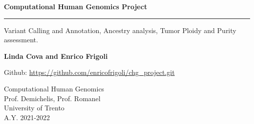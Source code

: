 \begin{titlepage}
    \begin{center}
        \vspace*{1cm}
        
        \Huge
        \textbf{Computational Human Genomics Project}

        \vspace{0.3cm}

        \rule{\textwidth}{.4pt}

        \vspace{0.5cm}
        
        \LARGE
        Variant Calling and Annotation, Ancestry analysis, Tumor Ploidy and Purity assessment.
        
        
        \vfill

        \Large
        
        \textbf{Linda Cova and Enrico Frigoli}
        
        \vspace{1cm}
        
        Github: \href{https://github.com/enricofrigoli/chg\_project.git}{https://github.com/enricofrigoli/chg\_project.git}
        
        \vspace{0.8cm}
        
        
        \Large
        Computational Human Genomics  \\
        Prof. Demichelis, Prof. Romanel \\
        University of Trento \\
        A.Y. 2021-2022

        
    \end{center}

\end{titlepage}